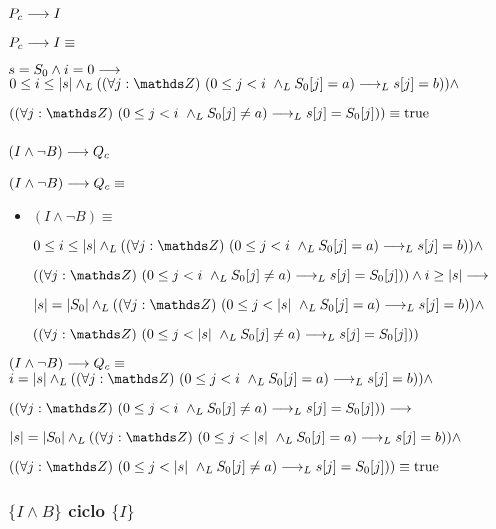 \documentclass{article}
\begin{document}
\subsubsection*{$P_{c} \longrightarrow I$}

$P_{c} \longrightarrow I \equiv$

$ s = S_{0} \wedge i = 0 \longrightarrow$
$ 0 \leq i \leq \longitud{s} \yLuego (\paraTodo{j}{(0}{i} \yLuego S_{0}[j] = a) \implicaLuego s[j] = b)) \wedge $

$ (\paraTodo{j}{(0}{i} \yLuego S_{0}[j] \neq a) \implicaLuego s[j] = S_{0}[j])) \equiv \True$

\subsubsection*{$(I \wedge \neg B) \longrightarrow Q_{c}$}

$ (I \wedge \neg B) \longrightarrow Q_{c} \equiv $

\begin{itemize}
    \item $(I \wedge \neg B) \equiv $

    $ 0 \leq i \leq \longitud{s} \yLuego (\paraTodo{j}{(0}{i} \yLuego S_{0}[j] = a) \implicaLuego s[j] = b)) \wedge $

    $ (\paraTodo{j}{(0}{i} \yLuego S_{0}[j] \neq a) \implicaLuego s[j] = S_{0}[j])) \wedge i \geq \longitud{s} \implica$

    $ \longitud{s} = \longitud{S_{0}} \yLuego (\paraTodo{j}{(0}{\longitud{s}} \yLuego S_{0}[j] = a) \implicaLuego s[j] = b)) \wedge $

    $ (\paraTodo{j}{(0}{\longitud{s}} \yLuego S_{0}[j] \neq a) \implicaLuego s[j] = S_{0}[j])) $


\end{itemize}

$ (I \wedge \neg B) \longrightarrow Q_{c} \equiv $\\

$ i = \longitud{s} \yLuego (\paraTodo{j}{(0}{i} \yLuego S_{0}[j] = a) \implicaLuego s[j] = b)) \wedge $

$ (\paraTodo{j}{(0}{i} \yLuego S_{0}[j] \neq a) \implicaLuego s[j] = S_{0}[j])) \implica$

$ \longitud{s} = \longitud{S_{0}} \yLuego (\paraTodo{j}{(0}{\longitud{s}} \yLuego S_{0}[j] = a) \implicaLuego s[j] = b)) \wedge $

$ (\paraTodo{j}{(0}{\longitud{s}} \yLuego S_{0}[j] \neq a) \implicaLuego s[j] = S_{0}[j])) \equiv \True$

\subsubsection*{$\{I \wedge B\}$ ciclo $\{ I \}$}
\end{document}
